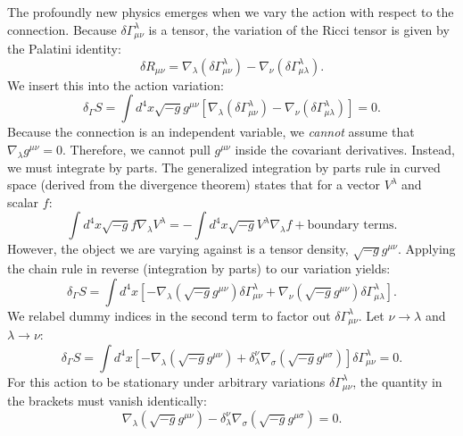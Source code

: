\documentclass[11pt, a4paper]{report}
\begin{document}
The profoundly new physics emerges when we vary the action with respect to the connection. Because $\delta\Gamma^{\lambda}_{\mu\nu}$ is a tensor, the variation of the Ricci tensor is given by the Palatini identity:
\begin{equation}
\delta R_{\mu\nu} = \nabla_{\lambda}(\delta\Gamma^{\lambda}_{\mu\nu}) - \nabla_{\nu}(\delta\Gamma^{\lambda}_{\mu\lambda}).
\end{equation}
We insert this into the action variation:
\begin{equation}
\delta_{\Gamma} S = \int d^{4}x \sqrt{-g} g^{\mu\nu} \left[ \nabla_{\lambda}(\delta\Gamma^{\lambda}_{\mu\nu}) - \nabla_{\nu}(\delta\Gamma^{\lambda}_{\mu\lambda}) \right] = 0.
\end{equation}
Because the connection is an independent variable, we \textit{cannot} assume that $\nabla_{\lambda}g^{\mu\nu} = 0$. Therefore, we cannot pull $g^{\mu\nu}$ inside the covariant derivatives. Instead, we must integrate by parts. The generalized integration by parts rule in curved space (derived from the divergence theorem) states that for a vector $V^{\lambda}$ and scalar $f$:
\begin{equation}
\int d^{4}x \sqrt{-g} f \nabla_{\lambda}V^{\lambda} = - \int d^{4}x \sqrt{-g} V^{\lambda} \nabla_{\lambda}f + \text{boundary terms}.
\end{equation}
However, the object we are varying against is a tensor density, $\sqrt{-g}g^{\mu\nu}$. Applying the chain rule in reverse (integration by parts) to our variation yields:
\begin{equation}
\delta_{\Gamma} S = \int d^{4}x \left[ -\nabla_{\lambda}(\sqrt{-g}g^{\mu\nu}) \delta\Gamma^{\lambda}_{\mu\nu} + \nabla_{\nu}(\sqrt{-g}g^{\mu\nu}) \delta\Gamma^{\lambda}_{\mu\lambda} \right].
\end{equation}
We relabel dummy indices in the second term to factor out $\delta\Gamma^{\lambda}_{\mu\nu}$. Let $\nu \to \lambda$ and $\lambda \to \nu$:
\begin{equation}
\delta_{\Gamma} S = \int d^{4}x \left[ -\nabla_{\lambda}(\sqrt{-g}g^{\mu\nu}) + \delta^{\nu}_{\lambda} \nabla_{\sigma}(\sqrt{-g}g^{\mu\sigma}) \right] \delta\Gamma^{\lambda}_{\mu\nu} = 0.
\end{equation}
For this action to be stationary under arbitrary variations $\delta\Gamma^{\lambda}_{\mu\nu}$, the quantity in the brackets must vanish identically:
\begin{equation}
\label{eq:palatini_bracket}
\nabla_{\lambda}(\sqrt{-g}g^{\mu\nu}) - \delta^{\nu}_{\lambda} \nabla_{\sigma}(\sqrt{-g}g^{\mu\sigma}) = 0.
\end{equation}
\end{document}
